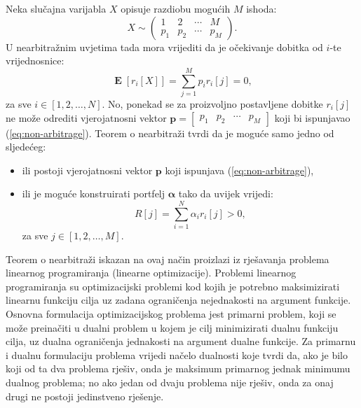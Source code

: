 \documentclass[lmodern, utf8, diplomski, numeric]{fer}
\newcommand{\matr}[1]{\mathbold{#1}}
\newcommand{\E}[1]{\operatorname{\mathbf{E}}\q[#1\w]}
\newcommand{\q}{\left}
\newcommand{\w}{\right}
\begin{document}
  Neka slučajna varijabla $X$ opisuje razdiobu mogućih $M$ ishoda:
  \begin{equation*}
    X \sim \begin{pmatrix} 1 & 2 & \cdots & M \\ p_1 & p_2 & \cdots & p_M \end{pmatrix}.
  \end{equation*}
  U nearbitražnim uvjetima tada mora vrijediti da je očekivanje dobitka od $i$-te vrijednosnice:
  \begin{equation}
  \label{eq:non-arbitrage}
  \E{r_i\q[X\w]} = \sum_{j=1}^{M} p_i r_i\q[j\w] = 0,
  \end{equation}
  za sve $i \in \q[1, 2, \ldots, N\w]$.
  No, ponekad se za proizvoljno postavljene dobitke $r_i\q[j\w]$ ne može odrediti vjerojatnosni vektor $\matr{p} = \begin{bmatrix} p_1 & p_2 & \cdots & p_M \end{bmatrix}$ koji bi ispunjavao (\ref{eq:non-arbitrage}).
  Teorem o nearbitraži tvrdi da je moguće samo jedno od sljedećeg:
  \begin{itemize}
    \item ili postoji vjerojatnosni vektor $\matr p$ koji ispunjava (\ref{eq:non-arbitrage}),
    \item ili je moguće konstruirati portfelj $\matr \alpha$ tako da uvijek vrijedi:
    \begin{equation}
      \label{eq:dual-arbitrage}
      R\q[j\w] = \sum_{i = 1}^{N} \alpha_i r_i\q[j\w] > 0,
    \end{equation}
    za sve $j \in \q[1, 2, \ldots, M\w]$.
  \end{itemize}

  Teorem o nearbitraži iskazan na ovaj način proizlazi iz rješavanja problema linearnog programiranja (linearne optimizacije).
  Problemi linearnog programiranja su optimizacijski problemi kod kojih je potrebno maksimizirati linearnu funkciju cilja uz zadana ograničenja nejednakosti na argument funkcije.
  Osnovna formulacija optimizacijskog problema jest primarni problem, koji se može preinačiti u dualni problem u kojem je cilj minimizirati dualnu funkciju cilja, uz dualna ograničenja jednakosti na argument dualne funkcije.
  Za primarnu i dualnu formulaciju problema vrijedi načelo dualnosti koje tvrdi da, ako je bilo koji od ta dva problema rješiv, onda je maksimum primarnog jednak minimumu dualnog problema; no ako jedan od dvaju problema nije rješiv, onda za onaj drugi ne postoji jedinstveno rješenje.
  
\end{document}
